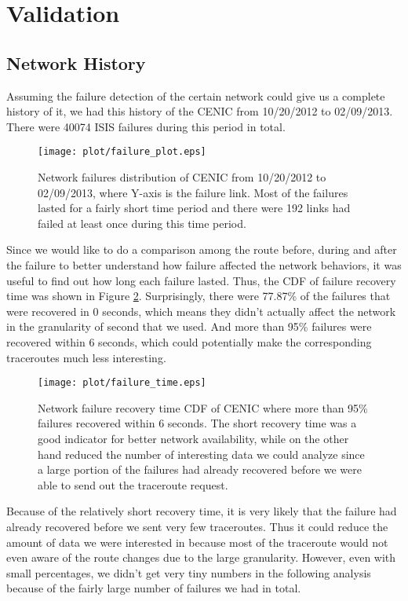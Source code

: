 \documentclass[conference, twocolumn, oneside, 10pt]{IEEEtran}
\begin{document}
\section{Validation}
\label{sec:sec5}

\subsection{Network History}

Assuming the failure detection of the certain network could give us a complete history of it, we had this history of the CENIC from 10/20/2012 to 02/09/2013. There were 40074 ISIS failures during this period in total.

\begin{figure}[h!]
\centering
\texttt{[image: plot/failure\_plot.eps]}
\caption{Network failures distribution of CENIC from 10/20/2012 to 02/09/2013, where Y-axis is the failure link. Most of the failures lasted for a fairly short time period and there were 192 links had failed at least once during this time period.}
\label{fig:failureplot}
\end{figure}

Since we would like to do a comparison among the route before, during and after the failure to better understand how failure affected the network behaviors, it was useful to find out how long each failure lasted. Thus, the CDF of failure recovery time was shown in Figure \ref{fig:failuretime}. Surprisingly, there were 77.87\% of the failures that were recovered in 0 seconds, which means they didn't actually affect the network in the granularity of second that we used. And more than 95\% failures were recovered within 6 seconds, which could potentially make the corresponding traceroutes much less interesting. 

\begin{figure}[h!]
\centering
\texttt{[image: plot/failure\_time.eps]}
\caption{Network failure recovery time CDF of CENIC where more than 95\% failures recovered within 6 seconds. The short recovery time was a good indicator for better network availability, while on the other hand reduced the number of interesting data we could analyze since a large portion of the failures had already recovered before we were able to send out the traceroute request. }
\label{fig:failuretime}
\end{figure}

Because of the relatively short recovery time, it is very likely that the failure had already recovered before we sent very few traceroutes. Thus it could reduce the amount of data we were interested in because most of the traceroute would not even aware of the route changes due to the large granularity. However, even with small percentages, we didn't get very tiny numbers in the following analysis because of the fairly large number of failures we had in total.
\end{document}
